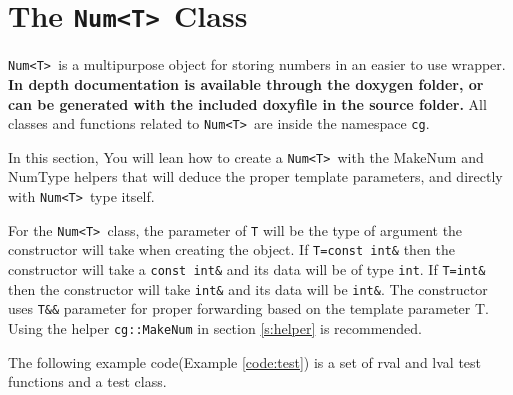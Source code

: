 \documentclass{article}
\newlength\tdima \newlength\tdimb \setlength\tdima{ \fboxsep+\fboxrule} \setlength\tdimb{-\fboxsep+\fboxrule}
\newcommand{\theobj}{\protect\Verb+Num<T> +}
\begin{document}
\tableofcontents




\captionsetup[lstlisting]{format=listing,labelfont=white,textfont=white}
\lstset{style=cppstyle}

\section{The \theobj Class}

\theobj is a multipurpose object for storing numbers in an easier to use wrapper. \textbf{In depth documentation is available through the doxygen folder, or can be generated with the included doxyfile in the source folder.}  All classes and functions related to \theobj are inside the namespace \protect\Verb+cg+.


In this section, You will lean how to create a \theobj with the MakeNum and NumType helpers that will deduce the proper template parameters, and directly with \theobj type itself.

For the \theobj class, the parameter of \Verb+T+ will be the type of argument the constructor will take when creating the object.  If \Verb+T=const int&+ then the constructor will take a \Verb+const int&+ and its data will be of type \Verb+int+. If \Verb+T=int&+ then the constructor will take \Verb+int&+ and its data will be \Verb+int&+.  The constructor uses \Verb+T&&+ parameter for proper forwarding based on the template parameter T.  Using the helper \protect\Verb+cg::MakeNum+ in section \vref{s:helper} is recommended.

The following example code(Example \vref{code:test}) is a set of rval and lval test functions and a test class.
\end{document}
